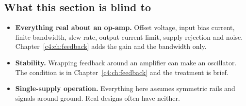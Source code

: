 \subsection{What this section is blind to}
\label{c3:sec:b6}
\begin{itemize}
  \item \textbf{Everything real about an op-amp.} Offset voltage, input bias current, finite bandwidth, slew rate, output current limit, supply rejection and noise. Chapter~\ref{c4:ch:feedback} adds the gain and the bandwidth only.
  \item \textbf{Stability.} Wrapping feedback around an amplifier can make an oscillator. The condition is in Chapter~\ref{c4:ch:feedback} and the treatment is brief.
  \item \textbf{Single-supply operation.} Everything here assumes symmetric rails and signals around ground. Real designs often have neither.
\end{itemize}
